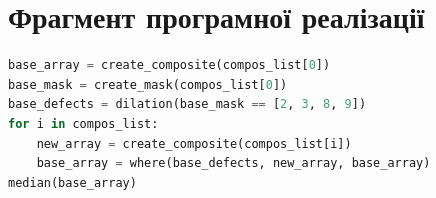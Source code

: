 \appendix
\chapter{Фрагмент програмної реалізації}
\begin{lstlisting}[language=Python,basicstyle=\ttfamily\small,frame=single]
base_array = create_composite(compos_list[0])
base_mask = create_mask(compos_list[0])
base_defects = dilation(base_mask == [2, 3, 8, 9])
for i in compos_list:
    new_array = create_composite(compos_list[i])
    base_array = where(base_defects, new_array, base_array)
median(base_array)
\end{lstlisting}
